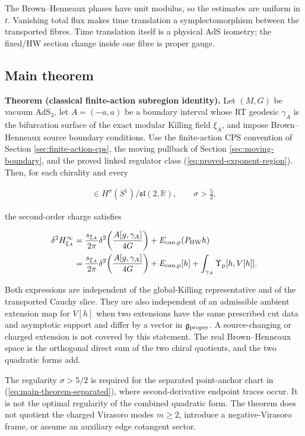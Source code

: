 The Brown--Henneaux phases have unit modulus, so the estimates are uniform in $t$. Vanishing total flux makes time translation a symplectomorphism between the transported fibres. Time translation itself is a physical AdS isometry; the fixed/HW section change inside one fibre is proper gauge.

\subsection{Main theorem}\label{subsec:main-theorem}

\textbf{Theorem (classical finite-action subregion identity).} Let $(M,G)$ be vacuum AdS$_3$, let $A=(-a,a)$ be a boundary interval whose RT geodesic $\gamma_A$ is the bifurcation surface of the exact modular Killing field $\xi_A$, and impose Brown--Henneaux source boundary conditions. Use the finite-action CPS convention of Section \ref{sec:finite-action-cps}, the moving pullback of Section \ref{sec:moving-boundary}, and the proved linked regulator class (\ref{eq:proved-exponent-region}). Then, for each chirality and every

\begin{align}
[f]\in H^\sigma(S^1)/\mathfrak{sl}(2,\mathbb R),
\qquad \sigma>\frac52,
\end{align}

the second-order charge satisfies

\begin{align}
\delta^2H_{\xi_A}^\infty
&=\frac{s_{\xi_A}}{2\pi}
\delta^2\!\left(\frac{A[g,\gamma_A]}{4G}\right)
+E_{{\rm can,p}}(P_{\rm HW}h) \label{eq:main-theorem-hw}\\
&=\frac{s_{\xi_A}}{2\pi}
\delta^2\!\left(\frac{A[g,\gamma_A]}{4G}\right)
+E_{{\rm can,p}}[h]
+\int_{\gamma_A}\Upsilon_{\rm p}[h,V[h]]. \label{eq:main-theorem-separated}
\end{align}

Both expressions are independent of the global-Killing representative and of the transported Cauchy slice. They are also independent of an admissible ambient extension map for $V[h]$ when two extensions have the same prescribed cut data and asymptotic support and differ by a vector in $\mathfrak g_{\rm proper}$. A source-changing or charged extension is not covered by this statement. The real Brown--Henneaux space is the orthogonal direct sum of the two chiral quotients, and the two quadratic forms add.

The regularity $\sigma>5/2$ is required for the separated point-anchor chart in (\ref{eq:main-theorem-separated}), where second-derivative endpoint traces occur. It is not the optimal regularity of the combined quadratic form. The theorem does not quotient the charged Virasoro modes $m\geq2$, introduce a negative-Virasoro frame, or assume an auxiliary edge cotangent sector.
